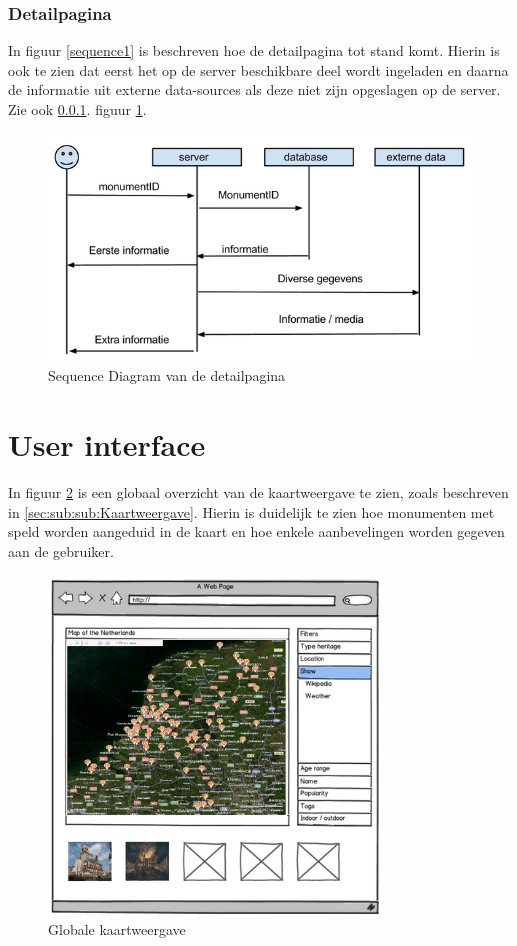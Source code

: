 \documentclass[a4paper,10pt]{article}
\newcommand{\rsection}[1]{
\section{#1}\label{sec:#1}
}
\newcommand{\rsubsubsection}[1]{
\subsubsection{#1}\label{sec:sub:sub:#1}
}
\begin{document}
			\rsubsubsection{Detailpagina}
In figuur \ref{sequence1} is beschreven hoe de detailpagina tot stand komt. Hierin is ook te zien dat eerst het op de server beschikbare deel wordt ingeladen en daarna de informatie uit externe data-sources als deze niet zijn opgeslagen op de server. Zie ook \ref{sec:sub:sub:Detailpagina}.
			figuur \ref{sequence2}.
			\begin{figure}[ht!]
				\centering
				\includegraphics[width=\textwidth]{sequence2.png}
				\caption{Sequence Diagram van de detailpagina \label{sequence2}}
			\end{figure}		
		\clearpage			
		\rsection{User interface}
		In figuur \ref{interface1} is een globaal overzicht van de kaartweergave te zien, zoals beschreven in \ref{sec:sub:sub:Kaartweergave}. Hierin is duidelijk te zien hoe monumenten met speld worden aangeduid in de kaart en hoe enkele aanbevelingen worden gegeven aan de gebruiker.
			\begin{figure}[ht!]
			\centering
			\includegraphics[height=9cm]{interface1.png}
			\caption{Globale kaartweergave \label{interface1}}
			\end{figure}
\end{document}
